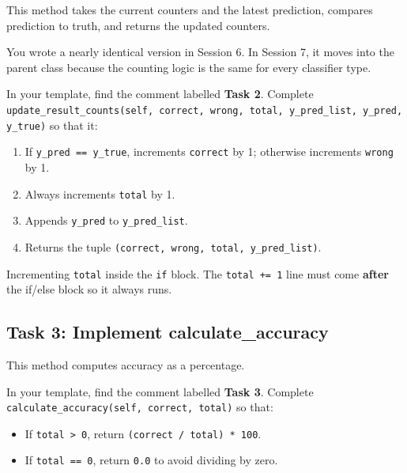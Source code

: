 \begin{tcolorbox}[title=Task 2: Implement update\_result\_counts]
This method takes the current counters and the latest prediction, compares prediction to truth, and returns the updated counters.

\medskip
\noindent
You wrote a nearly identical version in Session 6.
In Session 7, it moves into the parent class because the counting logic is the same for every classifier type.

\medskip
\noindent
In your template, find the comment labelled \textbf{Task 2}.
Complete \texttt{update\_result\_counts(self, correct, wrong, total, y\_pred\_list, y\_pred, y\_true)} so that it:
\begin{enumerate}
    \item If \texttt{y\_pred == y\_true}, increments \texttt{correct} by 1; otherwise increments \texttt{wrong} by 1.
    \item Always increments \texttt{total} by 1.
    \item Appends \texttt{y\_pred} to \texttt{y\_pred\_list}.
    \item Returns the tuple \texttt{(correct, wrong, total, y\_pred\_list)}.
\end{enumerate}
\end{tcolorbox}

\begin{tcolorbox}[title=Common Mistake]
Incrementing \texttt{total} inside the \texttt{if} block.
The \texttt{total += 1} line must come \textbf{after} the if/else block so it always runs.
\end{tcolorbox}

\subsection{Task 3: Implement calculate\_accuracy}

\begin{tcolorbox}[title=Task 3: Implement calculate\_accuracy]
This method computes accuracy as a percentage.

\medskip
\noindent
In your template, find the comment labelled \textbf{Task 3}.
Complete \texttt{calculate\_accuracy(self, correct, total)} so that:
\begin{itemize}\setlength{\itemsep}{2pt}
    \item If \texttt{total > 0}, return \texttt{(correct / total) * 100}.
    \item If \texttt{total == 0}, return \texttt{0.0} to avoid dividing by zero.
\end{itemize}
\end{tcolorbox}

